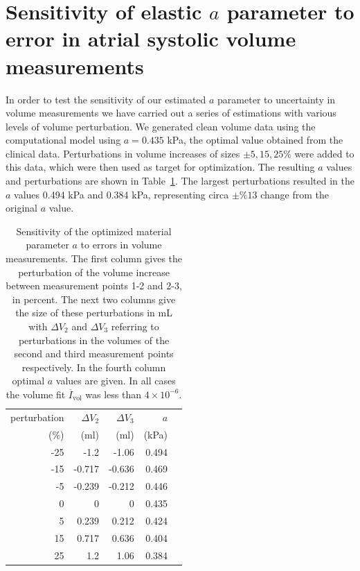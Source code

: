 \section{Sensitivity of elastic $a$ parameter to error in atrial systolic volume measurements}
In order to test the sensitivity of our estimated $a$ parameter to
uncertainty in volume measurements we have carried out a series of estimations with
various levels of volume perturbation. 
We generated clean volume data using the computational model using $a = 0.435$ kPa, 
the optimal value obtained from the clinical data. Perturbations in volume increases
of sizes $\pm 5,15, 25 \%$ were added to this data,
which were then used as target for optimization. The resulting $a$ values and perturbations
are shown in Table~\ref{tab:passive_synth_opt}. The largest perturbations resulted
in the $a$ values 0.494 kPa and 0.384 kPa, representing circa $\pm \%13$ change from the original $a$ value.


\begin{table}
\caption{Sensitivity of the optimized material parameter $a$ to errors in volume measurements.
The first column gives the perturbation of the volume increase 
between measurement points 1-2 and 2-3, in percent. 
The next two columns give the size of these perturbations in mL with $\Delta V_2$ 
and $\Delta V_3$ referring to perturbations in the 
volumes of the second and third measurement points respectively. In the fourth column 
optimal $a$ values are given. In all cases 
the volume fit $\overline{I}_{\mathrm{vol}}$ was less than $4 \times 10^{-6}$.}
\begin{tabular}{rrrrr}
\hline
	 perturbation  &   $\Delta V_2$ &   $\Delta V_3$ &      $a$ \\
                ($\%$) &   (ml) &   (ml) &      (kPa) \\
\hline
                   -25 &              -1.2   &              -1.06  &    0.494 \\
                   -15 &              -0.717 &              -0.636 &    0.469 \\
                    -5 &              -0.239 &              -0.212 &    0.446 \\
                     0 &               0     &               0     &    0.435 \\
                     5 &               0.239 &               0.212 &    0.424 \\
                    15 &               0.717 &               0.636 &    0.404 \\
                    25 &               1.2   &               1.06  &    0.384 \\
\hline
\end{tabular}
\label{tab:passive_synth_opt}
\end{table}

